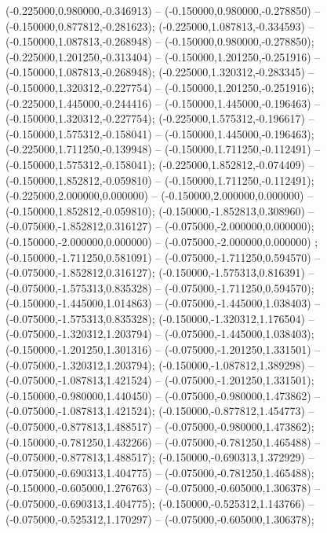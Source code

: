  (-0.225000,0.980000,-0.346913) -- (-0.150000,0.980000,-0.278850) -- (-0.150000,0.877812,-0.281623);
 (-0.225000,1.087813,-0.334593) -- (-0.150000,1.087813,-0.268948) -- (-0.150000,0.980000,-0.278850);
 (-0.225000,1.201250,-0.313404) -- (-0.150000,1.201250,-0.251916) -- (-0.150000,1.087813,-0.268948);
 (-0.225000,1.320312,-0.283345) -- (-0.150000,1.320312,-0.227754) -- (-0.150000,1.201250,-0.251916);
 (-0.225000,1.445000,-0.244416) -- (-0.150000,1.445000,-0.196463) -- (-0.150000,1.320312,-0.227754);
 (-0.225000,1.575312,-0.196617) -- (-0.150000,1.575312,-0.158041) -- (-0.150000,1.445000,-0.196463);
 (-0.225000,1.711250,-0.139948) -- (-0.150000,1.711250,-0.112491) -- (-0.150000,1.575312,-0.158041);
 (-0.225000,1.852812,-0.074409) -- (-0.150000,1.852812,-0.059810) -- (-0.150000,1.711250,-0.112491);
 (-0.225000,2.000000,0.000000) -- (-0.150000,2.000000,0.000000) -- (-0.150000,1.852812,-0.059810);
 (-0.150000,-1.852813,0.308960) -- (-0.075000,-1.852812,0.316127) -- (-0.075000,-2.000000,0.000000);
 (-0.150000,-2.000000,0.000000) -- (-0.075000,-2.000000,0.000000) ;
 (-0.150000,-1.711250,0.581091) -- (-0.075000,-1.711250,0.594570) -- (-0.075000,-1.852812,0.316127);
 (-0.150000,-1.575313,0.816391) -- (-0.075000,-1.575313,0.835328) -- (-0.075000,-1.711250,0.594570);
 (-0.150000,-1.445000,1.014863) -- (-0.075000,-1.445000,1.038403) -- (-0.075000,-1.575313,0.835328);
 (-0.150000,-1.320312,1.176504) -- (-0.075000,-1.320312,1.203794) -- (-0.075000,-1.445000,1.038403);
 (-0.150000,-1.201250,1.301316) -- (-0.075000,-1.201250,1.331501) -- (-0.075000,-1.320312,1.203794);
 (-0.150000,-1.087812,1.389298) -- (-0.075000,-1.087813,1.421524) -- (-0.075000,-1.201250,1.331501);
 (-0.150000,-0.980000,1.440450) -- (-0.075000,-0.980000,1.473862) -- (-0.075000,-1.087813,1.421524);
 (-0.150000,-0.877812,1.454773) -- (-0.075000,-0.877813,1.488517) -- (-0.075000,-0.980000,1.473862);
 (-0.150000,-0.781250,1.432266) -- (-0.075000,-0.781250,1.465488) -- (-0.075000,-0.877813,1.488517);
 (-0.150000,-0.690313,1.372929) -- (-0.075000,-0.690313,1.404775) -- (-0.075000,-0.781250,1.465488);
 (-0.150000,-0.605000,1.276763) -- (-0.075000,-0.605000,1.306378) -- (-0.075000,-0.690313,1.404775);
 (-0.150000,-0.525312,1.143766) -- (-0.075000,-0.525312,1.170297) -- (-0.075000,-0.605000,1.306378);
